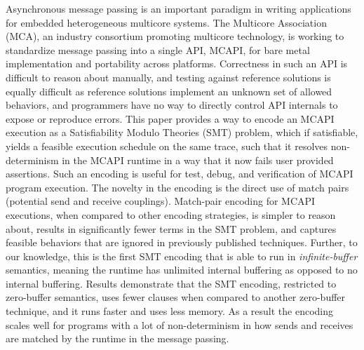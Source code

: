 
Asynchronous message passing is an important paradigm in writing
applications for embedded heterogeneous multicore systems.  The
Multicore Association (MCA), an industry consortium promoting
multicore technology, is working to standardize message passing into a
single API, MCAPI, for bare metal implementation and portability
across platforms.  Correctness in such an API is difficult to reason
about manually, and testing against reference solutions is equally
difficult as reference solutions implement an unknown set of allowed
behaviors, and programmers have no way to directly control API
internals to expose or reproduce errors.  This paper provides a way to
encode an MCAPI execution as a Satisfiability Modulo Theories (SMT)
problem, which if satisfiable, yields a feasible execution schedule on
the same trace, such that it resolves non-determinism in the MCAPI
runtime in a way that it now fails user provided assertions.  Such
an encoding is useful for test, debug, and verification of MCAPI
program execution.  The novelty in the encoding is the direct use of match
pairs (potential send and receive couplings).  Match-pair encoding for
MCAPI executions, when compared to other encoding strategies, is
simpler to reason about, results in significantly fewer terms in the
SMT problem, and captures feasible behaviors that are ignored in
previously published techniques. Further, to our knowledge, this is
the first SMT encoding that is able to run in \textit{infinite-buffer}
semantics, meaning the runtime has unlimited internal buffering as
opposed to no internal buffering. Results demonstrate that the SMT
encoding, restricted to zero-buffer semantics, uses fewer clauses when
compared to another zero-buffer technique, and it runs faster and uses
less memory. As a result the encoding scales well for programs with a
lot of non-determinism in how sends and receives are matched by the
runtime in the message passing.

